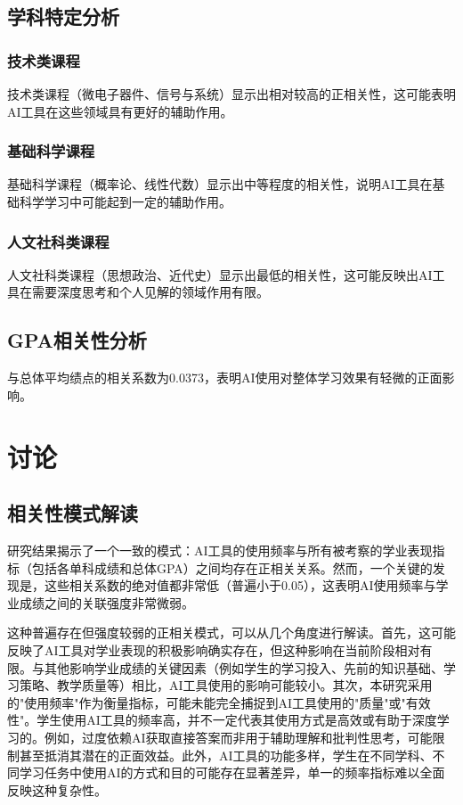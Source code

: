 \documentclass[a4paper,12pt]{article}
\begin{document}
\subsection{学科特定分析}
\subsubsection{技术类课程}
技术类课程（微电子器件、信号与系统）显示出相对较高的正相关性，这可能表明AI工具在这些领域具有更好的辅助作用。

\subsubsection{基础科学课程}
基础科学课程（概率论、线性代数）显示出中等程度的相关性，说明AI工具在基础科学学习中可能起到一定的辅助作用。

\subsubsection{人文社科类课程}
人文社科类课程（思想政治、近代史）显示出最低的相关性，这可能反映出AI工具在需要深度思考和个人见解的领域作用有限。

\subsection{GPA相关性分析}
与总体平均绩点的相关系数为0.0373，表明AI使用对整体学习效果有轻微的正面影响。

\section{讨论}
\subsection{相关性模式解读}

研究结果揭示了一个一致的模式：AI工具的使用频率与所有被考察的学业表现指标（包括各单科成绩和总体GPA）之间均存在正相关关系。然而，一个关键的发现是，这些相关系数的绝对值都非常低（普遍小于0.05），这表明AI使用频率与学业成绩之间的关联强度非常微弱。

这种普遍存在但强度较弱的正相关模式，可以从几个角度进行解读。首先，这可能反映了AI工具对学业表现的积极影响确实存在，但这种影响在当前阶段相对有限。与其他影响学业成绩的关键因素（例如学生的学习投入、先前的知识基础、学习策略、教学质量等）相比，AI工具使用的影响可能较小。其次，本研究采用的"使用频率"作为衡量指标，可能未能完全捕捉到AI工具使用的"质量"或"有效性"。学生使用AI工具的频率高，并不一定代表其使用方式是高效或有助于深度学习的。例如，过度依赖AI获取直接答案而非用于辅助理解和批判性思考，可能限制甚至抵消其潜在的正面效益。此外，AI工具的功能多样，学生在不同学科、不同学习任务中使用AI的方式和目的可能存在显著差异，单一的频率指标难以全面反映这种复杂性。
\end{document}
